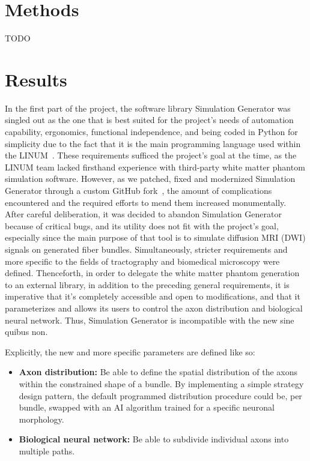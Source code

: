 \documentclass{article}
\begin{document}
  \section{Methods}\label{sec:methodology}

  TODO


  \section{Results}\label{sec:results}

  In the first part of the project, the software library Simulation Generator was singled out as the one that is best suited for the project's needs of automation capability, ergonomics, functional independence, and being coded in Python for simplicity due to the fact that it is the main programming language used within the LINUM~\cite{dubreuil2022inf6200}.
  These requirements sufficed the project's goal at the time, as the LINUM team lacked firsthand experience with third-party white matter phantom simulation software.
  However, as we patched, fixed and modernized Simulation Generator through a custom GitHub fork~\cite{dubreuil2022inm5803fiberconfiggen, valcourtcaron2022simulationgenerator}, the amount of complications encountered and the required efforts to mend them increased monumentally.
  After careful deliberation, it was decided to abandon Simulation Generator because of critical bugs, and its utility does not fit with the project's goal, especially since the main purpose of that tool is to simulate diffusion MRI (DWI) signals on generated fiber bundles.
  Simultaneously, stricter requirements and more specific to the fields of tractography and biomedical microscopy were defined.
  Thenceforth, in order to delegate the white matter phantom generation to an external library, in addition to the preceding general requirements, it is imperative that it's completely accessible and open to modifications, and that it parameterizes and allows its users to control the axon distribution and biological neural network.
  Thus, Simulation Generator is incompatible with the new sine quibus non.

  Explicitly, the new and more specific parameters are defined like so:
  \begin{itemize}
    \item \textbf{Axon distribution:} Be able to define the spatial distribution of the axons within the constrained shape of a bundle.
    By implementing a simple strategy design pattern, the default programmed distribution procedure could be, per bundle, swapped with an AI algorithm trained for a specific neuronal morphology.
    \item \textbf{Biological neural network:} Be able to subdivide individual axons into multiple paths.
  \end{itemize}
\end{document}
